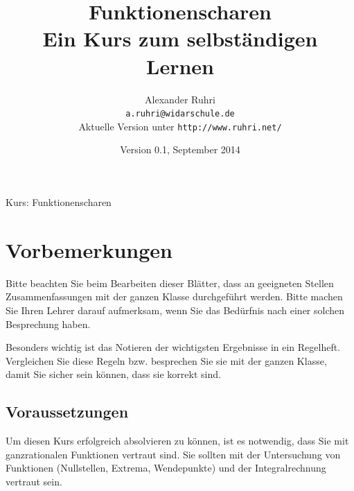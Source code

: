 \documentclass[12pt,a4paper,twoside,fleqn]{article}
\begin{document}
\renewcommand{\thepage}{Seite~\arabic{page}}
\renewcommand{\baselinestretch}{1.2}

\renewcommand{\labelenumi}{{\bf\arabic{enumi}.)}}
\renewcommand{\labelenumii}{{\bf\alph{enumii})}}
\renewcommand{\labelenumiii}{{\bf\roman{enumiii})}}

\renewcommand{\thecolumn}{{\bf\alph{column}\ }}
\newcommand{\labelcolumn}{{\bf\alph{column})\ \ \ }}
\setlength{\itemsep}{0pt}
\setlength{\mathindent}{0cm}





\pagestyle{myheadings}
%
{Kurs: Funktionenscharen\hfill}
\title{Funktionenscharen\\\large{Ein Kurs
    zum selbständigen Lernen}}
\author{Alexander Ruhri\\
  \small\texttt{a.ruhri@widarschule.de}\\
  \small Aktuelle Version unter \texttt{http://www.ruhri.net/}
}
\date{\small Version 0.1, September 2014}

\maketitle
\section*{Vorbemerkungen}
Bitte beachten Sie beim Bearbeiten dieser Blätter, dass an geeigneten
Stellen Zusammenfassungen mit der ganzen Klasse durchgeführt
werden. Bitte machen Sie Ihren Lehrer darauf aufmerksam, wenn Sie das
Bedürfnis nach einer solchen Besprechung haben. 

Besonders wichtig ist das Notieren der wichtigsten Ergebnisse in ein
Regelheft. Vergleichen Sie diese Regeln bzw. besprechen Sie sie mit
der ganzen Klasse, damit Sie sicher sein können, dass sie korrekt sind.

\subsection*{Voraussetzungen}
Um diesen Kurs erfolgreich absolvieren zu können, ist es notwendig,
dass Sie mit ganzrationalen Funktionen vertraut sind. Sie sollten mit
der Untersuchung von Funktionen (Nullstellen, Extrema, Wendepunkte)
und der Integralrechnung vertraut sein. 
\end{document}
